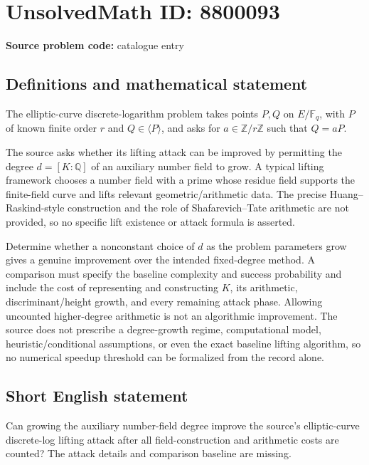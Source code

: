 \documentclass[11pt]{article}
\begin{document}
\section*{UnsolvedMath ID: 8800093}
\textbf{Source problem code:} catalogue entry
\subsection{Definitions and mathematical statement}
The elliptic-curve discrete-logarithm problem takes points $P,Q$ on $E/\mathbb F_q$, with $P$ of known finite order $r$ and $Q\in\langle P\rangle$, and asks for $a\in\mathbb Z/r\mathbb Z$ such that $Q=aP$.

The source asks whether its lifting attack can be improved by permitting the degree $d=[K:\mathbb Q]$ of an auxiliary number field to grow. A typical lifting framework chooses a number field with a prime whose residue field supports the finite-field curve and lifts relevant geometric/arithmetic data. The precise Huang--Raskind-style construction and the role of Shafarevich--Tate arithmetic are not provided, so no specific lift existence or attack formula is asserted.

Determine whether a nonconstant choice of $d$ as the problem parameters grow gives a genuine improvement over the intended fixed-degree method. A comparison must specify the baseline complexity and success probability and include the cost of representing and constructing $K$, its arithmetic, discriminant/height growth, and every remaining attack phase. Allowing uncounted higher-degree arithmetic is not an algorithmic improvement. The source does not prescribe a degree-growth regime, computational model, heuristic/conditional assumptions, or even the exact baseline lifting algorithm, so no numerical speedup threshold can be formalized from the record alone.
\subsection{Short English statement}
Can growing the auxiliary number-field degree improve the source's elliptic-curve discrete-log lifting attack after all field-construction and arithmetic costs are counted? The attack details and comparison baseline are missing.
\end{document}
